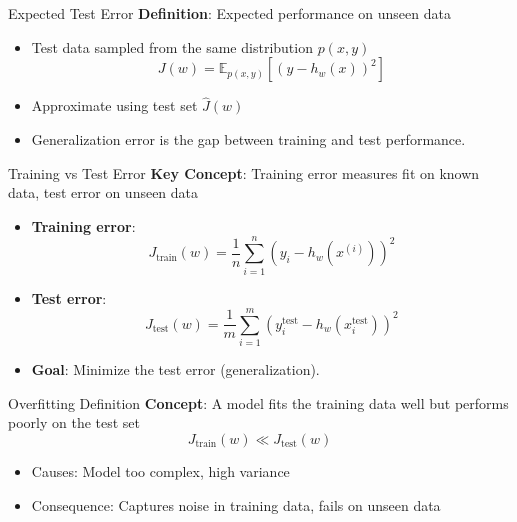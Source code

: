 \documentclass[serif, aspectratio=169]{beamer}
\begin{document}
\begin{frame}{Expected Test Error}
    \textbf{Definition}: Expected performance on unseen data
    \begin{itemize}
        \item Test data sampled from the same distribution \( p(x, y) \)
        \[
        J(w) = \mathbb{E}_{p(x,y)}[(y - h_w(x))^2]
        \]
        \item Approximate using test set \( \hat{J}(w) \)
        \item Generalization error is the gap between training and test performance.
    \end{itemize}
\end{frame}

\begin{frame}{Training vs Test Error}
    \textbf{Key Concept}: Training error measures fit on known data, test error on unseen data
    \begin{itemize}
        \item \textbf{Training error}:
        \[
        J_{\text{train}}(w) = \frac{1}{n} \sum_{i=1}^{n} (y_i - h_w(x^{(i)}))^2
        \]
        \item \textbf{Test error}:
        \[
        J_{\text{test}}(w) = \frac{1}{m} \sum_{i=1}^{m} (y_i^{\text{test}} - h_w(x_i^{\text{test}}))^2
        \]
        \item \textbf{Goal}: Minimize the test error (generalization).
    \end{itemize}
\end{frame}

\begin{frame}{Overfitting Definition}
    \textbf{Concept}: A model fits the training data well but performs poorly on the test set
    \[
    J_{\text{train}}(w) \ll J_{\text{test}}(w)
    \]
    \begin{itemize}
        \item Causes: Model too complex, high variance
        \item Consequence: Captures noise in training data, fails on unseen data
    \end{itemize}
\end{frame}
\end{document}

